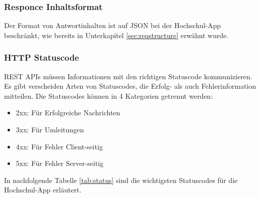 \subsubsection{Responce Inhaltsformat}
Der Format von Antwortinhalten ist auf JSON bei der Hochschul-App beschränkt, wie bereits in Unterkapitel \ref{sec:reqstructure} erwähnt wurde. 

\subsubsection{HTTP Statuscode}
REST APIs müssen Informationen mit den richtigen Statuscode kommunizieren. Es gibt verscheiden Arten von Statuscodes, die Erfolg- als auch Fehlerinformation mitteilen. Die Statuscodes können in 4 Kategorien getrennt werden:

\begin{itemize}
\item 2xx: Für Erfolgreiche Nachrichten
\item 3xx: Für Umleitungen
\item 4xx: Für Fehler Client-seitig
\item 5xx: Für Fehler Server-seitig
\end{itemize}

In nachfolgende Tabelle \ref{tab:status} sind die wichtigsten Statuscodes für die Hochschul-App erläutert.

